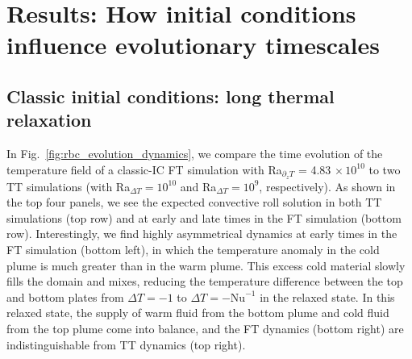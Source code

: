\documentclass[aps, pre, onecolumn, nofootinbib, notitlepage, groupedaddress, amsfonts, amssymb, amsmath, longbibliography, superscriptaddress]{revtex4-1}
\begin{document}
\section{Results: How initial conditions influence evolutionary timescales}
\label{sec:results_timescales}

\subsection{Classic initial conditions: long thermal relaxation}
\label{sec:time_evolution_classic_ICs}

In Fig.~\ref{fig:rbc_evolution_dynamics}, we compare the time evolution of the temperature field of a classic-IC FT simulation with Ra$_{\partial_z T}$ = 4.83$\,\times 10^{10}$ to two TT simulations (with Ra$_{\Delta T} = 10^{10}$ and Ra$_{\Delta T} = 10^9$, respectively).
As shown in the top four panels, we see the expected convective roll solution in both TT simulations (top row) and at early and late times in the FT simulation (bottom row).
Interestingly, we find highly asymmetrical dynamics at early times in the FT simulation (bottom left), in which the temperature anomaly in the cold plume is much greater than in the warm plume.
This excess cold material slowly fills the domain and mixes, reducing the temperature difference between the top and bottom plates from $\Delta T = -1$ to $\Delta T = -\text{Nu}^{-1}$ in the relaxed state.
In this relaxed state, the supply of warm fluid from the bottom plume and cold fluid from the top plume come into balance, and the FT dynamics (bottom right) are indistinguishable from TT dynamics (top right).
\end{document}

